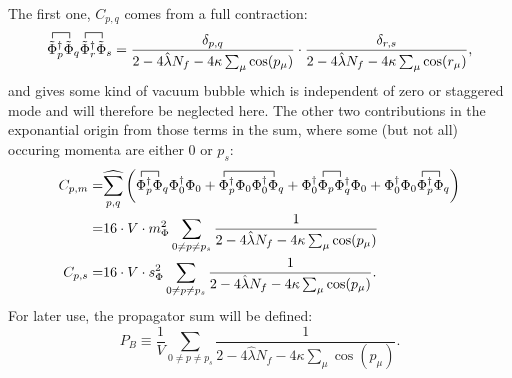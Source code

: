 The first one, $C_{p,q}$ comes from a full contraction:
\begin{equation}\label{eq:CEP_firstOrderLambda_VacuumBubble}
 \contraction{}{\tilde\Phi}{{}_p^{\dagger}}{\tilde\Phi} \tilde\Phi_p^{\dagger} \tilde\Phi_q
  \contraction{}{\tilde\Phi}{{}_r^{\dagger}}{\tilde\Phi} \tilde\Phi_r^{\dagger} \tilde\Phi_s = 
    \frac{ \delta_{p,q}}{2 - 4 \hat\lambda N_f - 4 \kappa \sum_{\mu} \cos(p_{\mu}) } \cdot 
    \frac{ \delta_{r,s}}{2 - 4 \hat\lambda N_f - 4 \kappa \sum_{\mu} \cos(r_{\mu}) },
\end{equation}
and gives some kind of vacuum bubble which is independent of zero or staggered mode 
and will therefore be neglected here.
The other two contributions in the exponantial origin from those terms in the sum, where some (but not all) occuring momenta are either $0$ or $p_s$:
\begin{align}\label{eq:CEP_firstOrderLambda_zeroModeContribution}
 C_{p,m}=& \widehat{\sum\limits_{p,q}} \left( 
             \contraction{}{\Phi}{{}_p^{\dagger}}{\Phi}                              \Phi_p^{\dagger} \Phi_q \Phi_0^{\dagger} \Phi_0
           + \contraction{}{\Phi}{{}_p^{\dagger} \Phi_0 \Phi_0^{\dagger}}{\Phi}      \Phi_p^{\dagger} \Phi_0 \Phi_0^{\dagger} \Phi_q
           + \contraction{\Phi_0^{\dagger} }{\Phi}{{}_p}{\Phi}                       \Phi_0^{\dagger} \Phi_p \Phi_q^{\dagger} \Phi_0
           + \contraction{\Phi_0^{\dagger} \Phi_0 }{\Phi}{{}_p^{\dagger}}{\Phi}      \Phi_0^{\dagger} \Phi_0 \Phi_p^{\dagger} \Phi_q
            \right) \nonumber \\
        =& 16 \cdot V \cdot m_{\Phi}^2 \sum\limits_{0\neq p \neq p_s} \frac{1}{2 - 4 \hat\lambda N_f - 4 \kappa \sum_{\mu} \cos(p_{\mu})} \\
  \label{eq:CEP_firstOrderLambda_staggeredModeContribution}
 C_{p,s}=& 16 \cdot V \cdot s_{\Phi}^2 \sum\limits_{0\neq p \neq p_s} \frac{1}{2 - 4 \hat\lambda N_f - 4 \kappa \sum_{\mu} \cos(p_{\mu})}.
\end{align}
For later use, the propagator sum will be defined:
\begin{equation}\label{eq:bosonicPropagatorSum_CEP}
 P_B \equiv \frac{1}{V}\sum\limits_{0\neq p\neq p_s} \frac{1}{2 - 4 \hat\lambda N_f - 4 \kappa \sum_{\mu} \cos(p_{\mu})}.
\end{equation}


